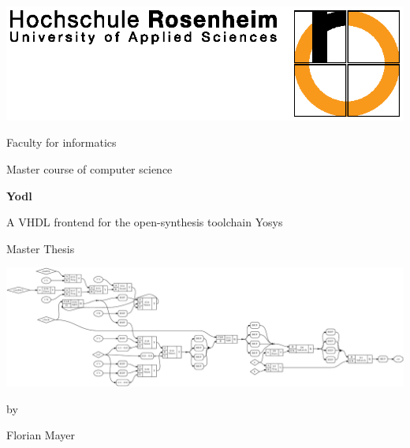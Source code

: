 \begin{titlepage}

\raggedleft

\vspace*{-2cm}

\includegraphics{figures/HSLogo.eps}


\vfill

\centering
\LARGE
\sffamily
    Faculty for informatics  \vspace{0.5cm}\\
\rmfamily
\Large

    \textsf{ Master course of computer science}

\vspace{2cm}

\LARGE

\vspace{-0.5cm}
    \textbf{Yodl}
\vspace{0.5cm}

    \textsf{A VHDL frontend for the open-synthesis toolchain Yosys}

\Large
\vspace{2cm}
    \textsf{Master Thesis}

\hspace*{-2.0cm}
\includegraphics[width=1.2\textwidth]{synthesisShowcase/clusterfuck.eps}




\Large
    \textsf{by}

\vspace{0.5cm}


\LARGE
    \textsf{Florian Mayer}
    \vspace{1cm}


\end{titlepage}
